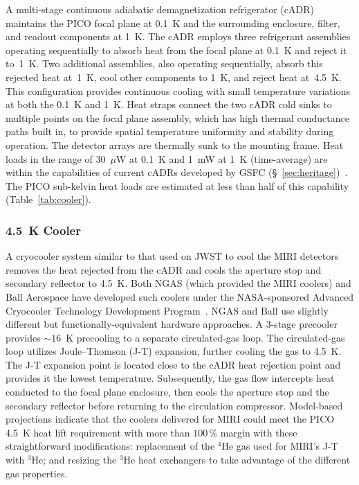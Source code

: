 A multi-stage continuous adiabatic demagnetization refrigerator (cADR) maintains the PICO focal plane at 0.1~K and the surrounding enclosure, filter, and readout components at 1~K. The cADR employs three refrigerant assemblies operating sequentially to absorb heat from the focal plane at 0.1~K and reject it to~1~K. Two additional assemblies, also operating sequentially, absorb this rejected heat at~1~K, cool other components to 1~K, and reject heat at~4.5~K. This configuration provides continuous cooling with small temperature variations at both the 0.1~K and 1~K. Heat straps connect the two cADR cold sinks to multiple points on the focal plane assembly,
which has high thermal conductance paths built in, to provide spatial temperature uniformity and stability during operation. The detector arrays are thermally sunk to the mounting frame.  Heat loads in the range of 30~$\mu$W at 0.1~K and 1~mW at 1~K (time-average) are within the capabilities of current cADRs developed by GSFC (\S~\ref{sec:heritage})~\citep{Shirron2012,Shirron2016}. The PICO sub-kelvin heat loads are estimated at less than half of this capability (Table~\ref{tab:cooler}).

\subsubsection{4.5~K Cooler}
\label{sec:4kcooler} %

A cryocooler system similar to that used on JWST to cool the MIRI detectors~\citep{Durand2008,Rabb2013} removes the heat rejected from the cADR and cools the aperture stop and secondary reflector to 4.5~K. Both NGAS (which provided the MIRI coolers) and Ball Aerospace have developed such coolers under the NASA-sponsored Advanced Cryocooler Technology Development Program~\citep{Glaister2006}. NGAS and Ball use slightly different but functionally-equivalent hardware approaches. A 3-stage precooler provides $\sim16$~K precooling to a separate circulated-gas loop.
The circulated-gas loop utilizes Joule--Thomson (J-T) expansion, further cooling the gas to 4.5~K.
The J-T expansion point is located close to the cADR heat rejection point and provides it the lowest temperature. Subsequently, the gas flow intercepts heat conducted to the focal plane enclosure, then cools the aperture stop and the secondary reflector before returning to the circulation compressor.  Model-based projections indicate that the coolers delivered for MIRI could meet the PICO 4.5~K heat lift requirement with more than $100\,\%$ margin with these straightforward modifications: replacement of the $^4$He gas used for MIRI's J-T  with $^3$He; and resizing the $^3$He heat exchangers to take advantage of the different gas properties.

